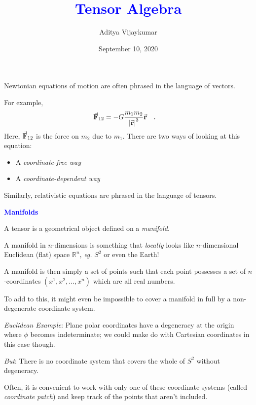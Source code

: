 \documentclass[landscape,aspectratio=169]{slides}
\title{\textcolor{blue}{\textbf{Tensor Algebra}}}
\date{September 10, 2020}
\author{Aditya Vijaykumar}
\begin{document}
	\maketitle
	\begin{slide}
	
	Newtonian equations of motion are often phrased in the language of vectors.
	
	For example, 	
	\begin{equation}\label{key}
	\va{F}_{12} = - G \dfrac{m_1 m_2}{\abs{\va{r}}^3} \va{r}  \qq{.}
	\end{equation}
	Here, $ \va{F}_{12} $ is the force on $ m_2 $ due to $ m_1 $. There are two ways of looking at this equation:
	\begin{itemize}
		\item A \textit{coordinate-free way}
		\item A \textit{coordinate-dependent way}
	\end{itemize}
	Similarly,  relativistic equations are phrased in the language of tensors.
\end{slide}
\begin{slide}
	\textcolor{blue}{\textbf{Manifolds}}
	
	A tensor is a geometrical object defined on a \textit{manifold}.
	
	A manifold in $ n $-dimensions is something that \textit{locally} looks like $ n $-dimensional Euclidean (flat) space $\mathbb{R}^n $, \textit{eg.} $ S^2 $ or even the Earth!
	
	A manifold is then simply a set of points such that each point possesses a set of $ n $-coordinates $ (x^1, x^2, \ldots, x^n) $ which are all real numbers.
\end{slide}	
\begin{slide}
	To add to this, it might even be impossible to cover a manifold in full by a non-degenerate coordinate system.
	
	\textit{Euclidean Example}: Plane polar coordinates have a degeneracy at the origin where $ \phi $ becomes indeterminate; we could make do with Cartesian coordinates in this case though.
	
	\textit{But}: There is no coordinate system that covers the whole of $ S^2 $ without degeneracy. 
	
	Often, it is convenient to work with only one of these coordinate systems (called \textit{coordinate patch}) and keep track of the points that aren't included.
\end{slide}
\end{document}
